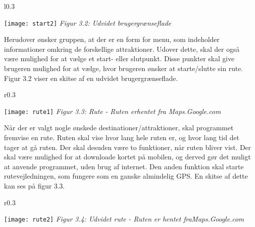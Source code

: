 \begin{wrapfigure}{l}{0.3\textwidth}
  \vspace{-50pt}
  \begin{center}
    \texttt{[image: start2]} \newline
    \textit{Figur 3.2: \newline Udvidet brugergrænseflade}\newline
  \end{center}
  \vspace{20pt}
\end{wrapfigure}

Herudover ønsker gruppen, at der er en form for menu, som indeholder informationer omkring de forskellige attraktioner. Udover dette, skal der også være mulighed for at vælge et start- eller slutpunkt. Disse punkter skal give brugeren mulighed for at vælge, hvor brugeren ønsker at starte/slutte sin rute. Figur 3.2 viser en skitse af en udvidet brugergrænseflade.\newline
\newline
\newline
\newline
\newline

\begin{wrapfigure}{r}{0.3\textwidth}
  \vspace{-30pt}
  \begin{center}
    \texttt{[image: rute1]} \newline
    \textit{Figur 3.3: Rute - Ruten er\newline hentet fra Maps.Google.com}\newline
  \end{center}
  \vspace{0pt}
  \vspace{-100pt}
\end{wrapfigure}


Når der er valgt nogle ønskede destinationer/attraktioner, skal programmet fremvise en rute. Ruten skal vise hvor lang hele ruten er, og hvor lang tid det tager at gå ruten. Der skal desuden være to funktioner, når ruten bliver vist. Der skal være mulighed for at downloade kortet på mobilen, og derved gør det muligt at anvende programmet, uden brug af internet. Den anden funktion skal starte rutevejledningen, som fungere som en ganske almindelig GPS. En skitse af dette kan ses på figur 3.3.
\newpage

\begin{wrapfigure}{r}{0.3\textwidth}
  \vspace{-20pt}
  \begin{center}
    \texttt{[image: rute2]} \newline
    \textit{Figur 3.4: Udvidet rute - Ruten er hentet fra\newline Maps.Google.com}\newline
  \end{center}
  \vspace{-20pt}
  \vspace{-10pt}
\end{wrapfigure}

